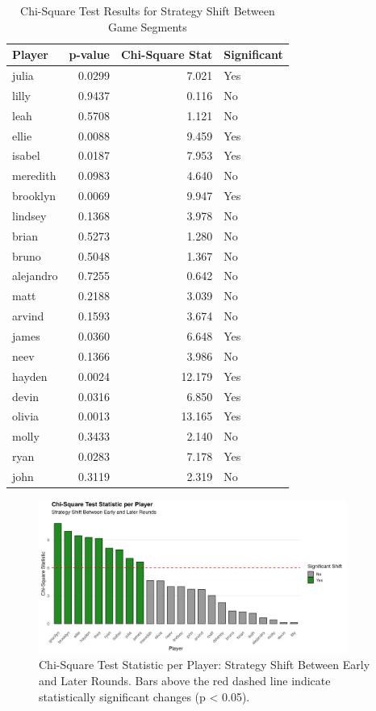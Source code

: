 \documentclass[12pt]{article}
\begin{document}
\begin{multicols}{2}
\newpage
\begin{table}[H]
\centering
\caption{Chi-Square Test Results for Strategy Shift Between Game Segments}
\label{tab:strategy_shift}
\begin{tabular}{lrrl}
\toprule
\textbf{Player} & \textbf{p-value} & \textbf{Chi-Square Stat} & \textbf{Significant} \\
\midrule
julia     & 0.0299 & 7.021 & Yes \\
lilly     & 0.9437 & 0.116 & No \\
leah      & 0.5708 & 1.121 & No \\
ellie     & 0.0088 & 9.459 & Yes \\
isabel    & 0.0187 & 7.953 & Yes \\
meredith  & 0.0983 & 4.640 & No \\
brooklyn  & 0.0069 & 9.947 & Yes \\
lindsey   & 0.1368 & 3.978 & No \\
brian     & 0.5273 & 1.280 & No \\
bruno     & 0.5048 & 1.367 & No \\
alejandro & 0.7255 & 0.642 & No \\
matt      & 0.2188 & 3.039 & No \\
arvind    & 0.1593 & 3.674 & No \\
james     & 0.0360 & 6.648 & Yes \\
neev      & 0.1366 & 3.986 & No \\
hayden    & 0.0024 & 12.179 & Yes \\
devin     & 0.0316 & 6.850 & Yes \\
olivia    & 0.0013 & 13.165 & Yes \\
molly     & 0.3433 & 2.140 & No \\
ryan      & 0.0283 & 7.178 & Yes \\
john      & 0.3119 & 2.319 & No \\
\bottomrule
\end{tabular}
\end{table}

\end{multicols}


\begin{figure}[H]
\centering
\includegraphics[width=0.9\textwidth]{figures/strategy_shift_chisq.png}
\caption{Chi-Square Test Statistic per Player: Strategy Shift Between Early and Later Rounds. Bars above the red dashed line indicate statistically significant changes (p < 0.05).}
\label{fig:strategy_shift_bar_appendix}
\end{figure}
\end{document}
